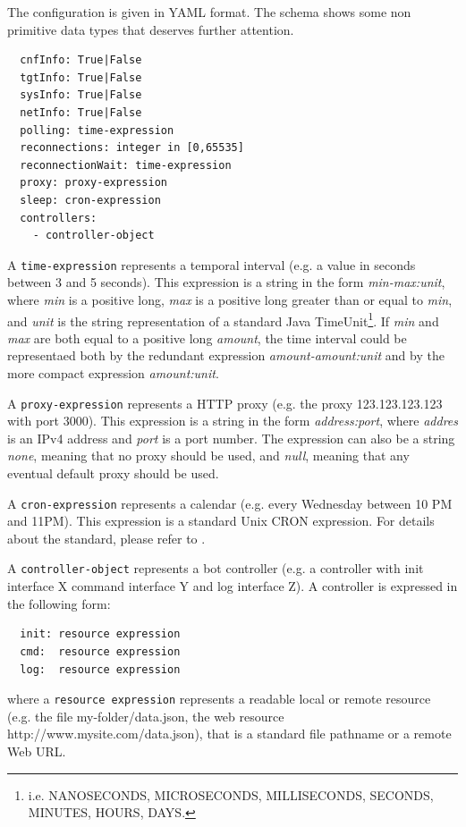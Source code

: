The configuration is given in YAML format. The schema shows some non primitive data types that deserves further attention.

\begin{verbatim}
  cnfInfo: True|False
  tgtInfo: True|False
  sysInfo: True|False
  netInfo: True|False
  polling: time-expression
  reconnections: integer in [0,65535]
  reconnectionWait: time-expression
  proxy: proxy-expression
  sleep: cron-expression
  controllers:
    - controller-object
\end{verbatim}

A \texttt{time-expression} represents a temporal interval (e.g. a value in seconds between 3 and 5 seconds). This expression is a string in the form \textit{min-max:unit}, where \textit{min} is a positive long, \textit{max} is a positive long greater than or equal to \textit{min}, and \textit{unit} is the string representation of a standard Java TimeUnit\footnote{i.e. NANOSECONDS, MICROSECONDS, MILLISECONDS, SECONDS, MINUTES, HOURS, DAYS.}. If \textit{min} and \textit{max} are both equal to a positive long \textit{amount}, the time interval could be representaed both by the redundant expression \textit{amount-amount:unit} and by the more compact expression \textit{amount:unit}.

A \texttt{proxy-expression} represents a HTTP proxy (e.g. the proxy 123.123.123.123 with port 3000). This expression is a string in the form \textit{address:port}, where \textit{addres} is an IPv4 address and \textit{port} is a port number. The expression can also be a string \textit{none}, meaning that no proxy should be used, and \textit{null}, meaning that any eventual default proxy should be used.

A \texttt{cron-expression} represents a calendar (e.g. every Wednesday between 10 PM and 11PM). This expression is a standard Unix CRON expression. For details about the standard, please refer to \cite{cron-expression}.

A \texttt{controller-object} represents a bot controller (e.g. a controller with init interface X command interface Y and log interface Z). A controller is expressed in the following form:

\begin{verbatim}
  init: resource expression
  cmd:  resource expression
  log:  resource expression
\end{verbatim}

where a \texttt{resource expression} represents a readable local or remote resource (e.g. the file my-folder/data.json, the web resource http://www.mysite.com/data.json), that is a standard file pathname or a remote Web URL.

